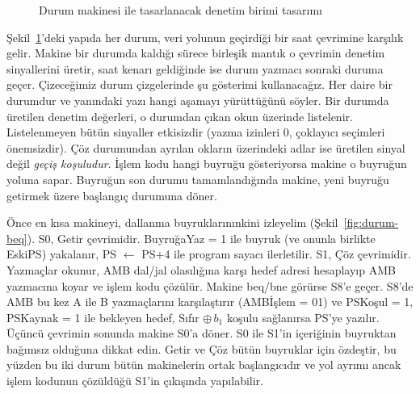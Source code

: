 \begin{figure}[htbp]
\centering
{}
\caption{Durum makinesi ile tasarlanacak denetim birimi tasarımı}
\label{fig:durum-makinesi-genel}
\end{figure}

Şekil~\ref{fig:durum-makinesi-genel}'deki yapıda her durum, veri yolunun geçirdiği bir saat çevrimine karşılık gelir. Makine bir durumda kaldığı sürece birleşik mantık o çevrimin denetim sinyallerini üretir, saat kenarı geldiğinde ise durum yazmacı sonraki duruma geçer. Çizeceğimiz durum çizgelerinde şu gösterimi kullanacağız. Her daire bir durumdur ve yanındaki yazı hangi aşamayı yürüttüğünü söyler. Bir durumda üretilen denetim değerleri, o durumdan çıkan okun üzerinde listelenir. Listelenmeyen bütün sinyaller etkisizdir (yazma izinleri 0, çoklayıcı seçimleri önemsizdir). Çöz durumundan ayrılan okların üzerindeki adlar ise üretilen sinyal değil \emph{geçiş koşuludur}. İşlem kodu hangi buyruğu gösteriyorsa makine o buyruğun yoluna sapar. Buyruğun son durumu tamamlandığında makine, yeni buyruğu getirmek üzere başlangıç durumuna döner.

Önce en kısa makineyi, dallanma buyruklarınınkini izleyelim (Şekil~\ref{fig:durum-beq}). S0, Getir çevrimidir. BuyruğaYaz = 1 ile buyruk (ve onunla birlikte EskiPS) yakalanır, PS $\leftarrow$ PS$+$4 ile program sayacı ilerletilir. S1, Çöz çevrimidir. Yazmaçlar okunur, AMB dal/jal olasılığına karşı hedef adresi hesaplayıp AMB yazmacına koyar ve işlem kodu çözülür. Makine beq/bne görürse S8'e geçer. S8'de AMB bu kez A ile B yazmaçlarını karşılaştırır (AMBİşlem = 01) ve PSKoşul = 1, PSKaynak = 1 ile bekleyen hedef, Sıfır $\oplus\, b_1$ koşulu sağlanırsa PS'ye yazılır. Üçüncü çevrimin sonunda makine S0'a döner. S0 ile S1'in içeriğinin buyruktan bağımsız olduğuna dikkat edin. Getir ve Çöz bütün buyruklar için özdeştir, bu yüzden bu iki durum bütün makinelerin ortak başlangıcıdır ve yol ayrımı ancak işlem kodunun çözüldüğü S1'in çıkışında yapılabilir.

